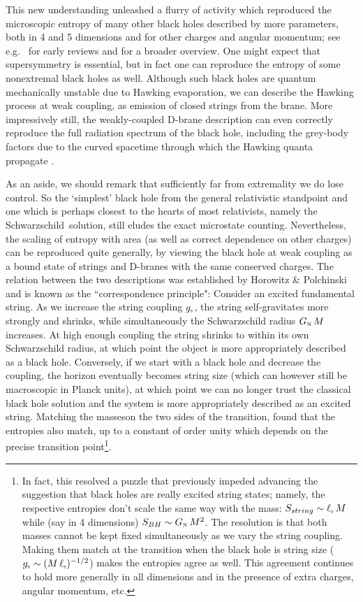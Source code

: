 \documentclass[12pt]{article}
\def\schw{Schwarzschild}
\def\gst{g_{\scriptscriptstyle {\rm s}}}
\def\GN{G_{\scriptscriptstyle {\rm N}}}
\def\lst{\ell_{\scriptscriptstyle {\rm s}}}
\begin{document}
This new understanding unleashed a flurry of activity which
reproduced the microscopic entropy of many other black holes described by more parameters, both in 4 and 5 dimensions and for other charges and angular momentum; see e.g.\ \cite{Horowitz:1996qd,Horowitz:1996rn} for early reviews and \cite{Dabholkar:2012zz} for a broader overview. 
One might expect that supersymmetry is essential, but in fact one can reproduce the entropy of some nonextremal black holes as well.  Although such black holes are quantum mechanically unstable due to Hawking evaporation, we can describe the Hawking process at weak coupling, as emission of closed strings from the brane.  More impressively still, the weakly-coupled D-brane description can even correctly reproduce the full radiation  spectrum of the black hole, including the grey-body factors due to the curved spacetime through which the Hawking quanta propagate  \cite{Maldacena:1996ix}.


As an aside, we should remark that sufficiently far from extremality we do lose control.  So the `simplest' black hole from the general relativistic standpoint and one which is perhaps closest to the hearts of most relativists, namely the \schw\ solution, still eludes the exact microstate counting.  Nevertheless, the scaling of entropy with area (as well as correct dependence on other charges) can be reproduced quite generally, by viewing the black hole at weak coupling as a bound state of strings and D-branes with the same conserved charges.  The relation between the two descriptions was established by Horowitz \& Polchinski    \cite{Horowitz:1996nw} and is known as the ``correspondence principle": Consider an excited fundamental string.  As we increase the string coupling $\gst$, the string self-gravitates more strongly and shrinks, while simultaneously the Schwarzschild radius $\GN \, M$ increases.  At high enough coupling the string shrinks to within its own Schwarzschild radius, at which point the object is more appropriately described as a black hole.  Conversely, if we start with a black hole and decrease the coupling,  the horizon eventually becomes string size (which can however still be macroscopic in Planck units),  at which point we can no longer trust the classical black hole solution and the system is more appropriately described as an excited string. Matching the masseson the two sides of the transition, \cite{Horowitz:1996nw} found that the entropies also match, up to a constant of order unity which depends on the precise transition point\footnote{
In fact, this resolved a puzzle that previously impeded advancing the suggestion \cite{Susskind:1993ws} that black holes are really excited string states; namely, the respective entropies don't scale the same way with the mass:  $S_{string} \sim \lst \, M$ while (say in 4 dimensions) $S_{BH} \sim \GN \, M^2$.  The resolution is that both masses cannot be kept fixed simultaneously as we vary the string coupling.  Making them match at the transition when the black hole is string size ($\gst \sim (M \, \lst)^{-1/2}$) makes the entropies agree as well.  This agreement continues to hold more generally in all dimensions and in the presence of extra charges, angular momentum, etc.
}. 
\end{document}

